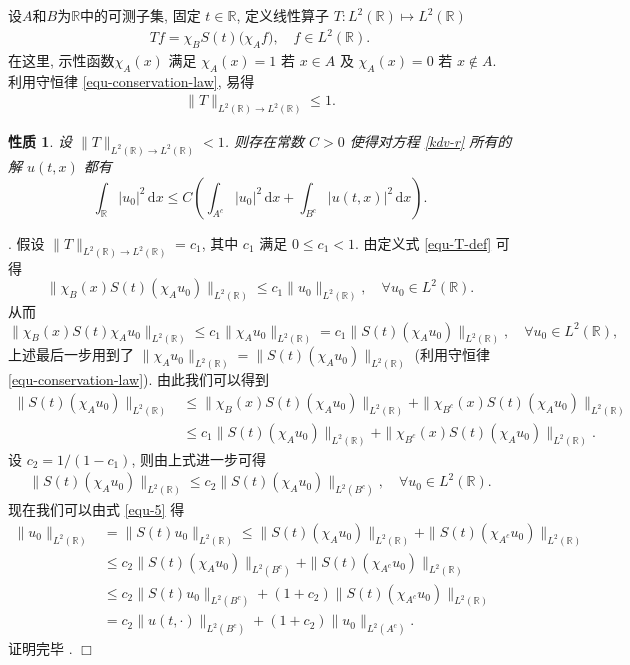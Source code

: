 \documentclass[master]{cugthesis}
\newcommand\R{\ensuremath{\mathbb{R}}}
\renewcommand\d{\ensuremath{\,\mathrm{d}}}
\newenvironment{proof}{{\noindent\itshape 证明}.}{\hfill $\Box$\par}
\newtheorem{proposition}{性质}[chapter]
\begin{document}
设$A$和$B$为$\R$中的可测子集, 固定 $t\in \R$, 定义线性算子 $T:L^2(\R)\mapsto L^2(\R)$
\begin{align}\label{equ-T-def}
Tf = \chi_BS(t)\big( \chi_A f \big), \quad f\in L^2(\R).
\end{align}
在这里, 示性函数$\chi_A(x)$ 满足 $\chi_A(x)=1$ 若 $x\in A$ 及 $\chi_A(x)=0$ 若 $x\notin A$. 利用守恒律 \eqref{equ-conservation-law}, 易得
\begin{align}\label{equ-T-norm}
\|T\|_{L^2(\R)\to L^2(\R)}\leq 1.
\end{align}

\begin{proposition}\label{prop-T}
设 $\|T\|_{L^2(\R)\to L^2(\R)}< 1$. 则存在常数 $C>0$ 使得对方程 \eqref{kdv-r} 所有的解 $u(t,x)$ 都有
$$
    \int_\R |u_0|^2\d x \leq C\left( \int_{A^c}|u_0|^2\d x + \int_{B^c}|u(t,x)|^2\d x \right).
$$
\end{proposition}
\begin{proof}
假设 $\|T\|_{L^2(\R)\to L^2(\R)}=c_1$, 其中 $c_1$ 满足 $0\leq c_1<1$. 由定义式 \eqref{equ-T-def} 可得
$$
\|\chi_B(x)S(t)(\chi_Au_0)\|_{L^2(\R)}\leq c_1\|u_0\|_{L^2(\R)}, \quad \forall u_0\in L^2(\R).
$$
从而
 $$
\|\chi_B(x)S(t) \chi_Au_0\|_{L^2(\R)}\leq c_1\|\chi_Au_0\|_{L^2(\R)}=c_1\|S(t) (\chi_Au_0)\|_{L^2(\R)}, \quad \forall u_0\in L^2(\R),
$$
上述最后一步用到了  $\|\chi_Au_0\|_{L^2(\R)}=\|S(t) (\chi_Au_0)\|_{L^2(\R)}$ (利用守恒律 \eqref{equ-conservation-law}). 由此我们可以得到
\begin{align*}
\|S(t) (\chi_Au_0)\|_{L^2(\R)}&\leq \|\chi_B(x)S(t) (\chi_Au_0)\|_{L^2(\R)}+\|\chi_{B^c}(x)S(t) (\chi_Au_0)\|_{L^2(\R)}\\
&\leq c_1\|S(t) (\chi_Au_0)\|_{L^2(\R)}+\|\chi_{B^c}(x)S(t) (\chi_Au_0)\|_{L^2(\R)}.
\end{align*}
设  $c_2=1/(1-c_1)$, 则由上式进一步可得
\begin{align}\label{equ-5}
 \|S(t) (\chi_Au_0)\|_{L^2(\R)}\leq c_2\|S(t) (\chi_Au_0)\|_{L^2(B^c)}, \quad \forall u_0\in L^2(\R).
\end{align}
现在我们可以由式 \eqref{equ-5} 得
\begin{align*}
\|u_0\|_{L^2(\R)} &= \|S(t)u_0\|_{L^2(\R)}\leq \|S(t) (\chi_Au_0)\|_{L^2(\R)}+\|S(t) (\chi_{A^c}u_0)\|_{L^2(\R)}\\
&\leq c_2\|S(t) (\chi_Au_0)\|_{L^2(B^c)}+\|S(t) (\chi_{A^c}u_0)\|_{L^2(\R)}\\
&\leq c_2\|S(t)u_0\|_{L^2(B^c)}+(1+c_2)\|S(t) (\chi_{A^c}u_0)\|_{L^2(\R)}\\
&=c_2\|u(t,\cdot)\|_{L^2(B^c)}+(1+c_2)\|u_0\|_{L^2(A^c)}.
\end{align*}
证明完毕 .
\end{proof}
\end{document}
